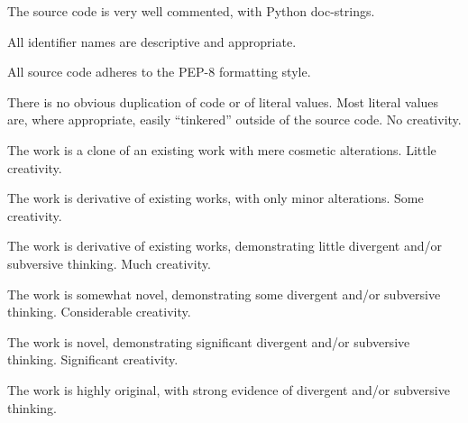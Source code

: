 \documentclass{../../fal_assignment}
\begin{document}
\begin{markingrubric}
	\grade The source code is very well commented, with Python doc-strings.
	\par All identifier names are descriptive and appropriate.
	\par All source code adheres to the PEP-8 formatting style.
	\par There is no obvious duplication of code or of literal values. Most literal values are, where appropriate, easily ``tinkered'' outside of the source code.  
	\grade\fail No creativity.
	\par The work is a clone of an existing work with mere cosmetic alterations.
	\grade Little creativity.
	\par The work is derivative of existing works, with only minor alterations.
	\grade Some creativity.
	\par The work is derivative of existing works, demonstrating little divergent and/or subversive thinking.
	\grade Much creativity.
	\par The work is somewhat novel, demonstrating some divergent and/or subversive thinking.
	\grade Considerable creativity.
	\par The work is novel, demonstrating significant divergent and/or subversive thinking.
	\grade Significant creativity.
	\par The work is highly original, with strong evidence of divergent and/or subversive thinking.

\end{markingrubric}
\end{document}
